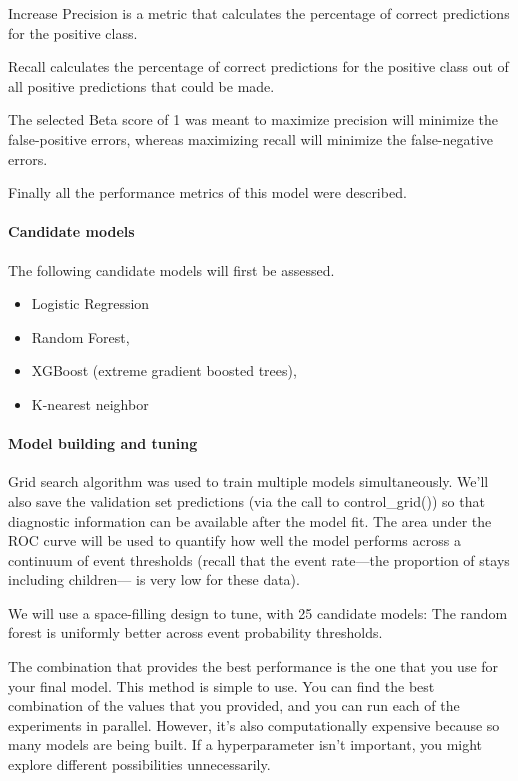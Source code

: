 \documentclass[
]{article}
\providecommand{\tightlist}{%
  \setlength{\itemsep}{0pt}\setlength{\parskip}{0pt}}
\begin{document}
Increase Precision is a metric that calculates the percentage of correct
predictions for the positive class.

Recall calculates the percentage of correct predictions for the positive
class out of all positive predictions that could be made.

The selected Beta score of 1 was meant to maximize precision will
minimize the false-positive errors, whereas maximizing recall will
minimize the false-negative errors.

Finally all the performance metrics of this model were described.

\hypertarget{candidate-models}{%
\paragraph{Candidate models}\label{candidate-models}}

The following candidate models will first be assessed.

\begin{itemize}
\tightlist
\item
  Logistic Regression
\item
  Random Forest,
\item
  XGBoost (extreme gradient boosted trees),
\item
  K-nearest neighbor
\end{itemize}

\hypertarget{model-building-and-tuning-1}{%
\paragraph{Model building and
tuning}\label{model-building-and-tuning-1}}

Grid search algorithm was used to train multiple models simultaneously.
We'll also save the validation set predictions (via the call to
control\_grid()) so that diagnostic information can be available after
the model fit. The area under the ROC curve will be used to quantify how
well the model performs across a continuum of event thresholds (recall
that the event rate---the proportion of stays including children--- is
very low for these data).

We will use a space-filling design to tune, with 25 candidate models:
The random forest is uniformly better across event probability
thresholds.

The combination that provides the best performance is the one that you
use for your final model. This method is simple to use. You can find the
best combination of the values that you provided, and you can run each
of the experiments in parallel. However, it's also computationally
expensive because so many models are being built. If a hyperparameter
isn't important, you might explore different possibilities
unnecessarily.
\end{document}
